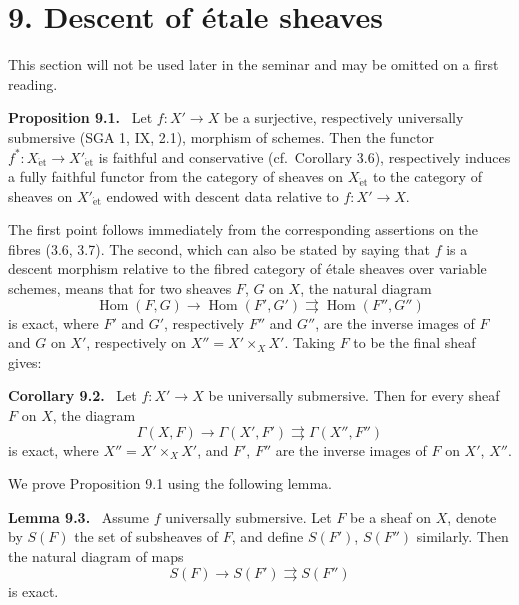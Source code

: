 \documentclass[11pt]{article}
\newcommand{\Hom}{\operatorname{Hom}}
\newcommand{\et}{\mathrm{\acute{e}t}}
\newcommand{\cf}{cf.\ }
\newcommand{\SGA}{SGA}
\newenvironment{statement}[1]{\par\medskip\noindent\textbf{#1.}\ }{\par\medskip}
\begin{document}
\section*{9. Descent of \'etale sheaves}

This section will not be used later in the seminar and may be omitted on a first reading.

\begin{statement}{Proposition 9.1}
Let \(f:X'\to X\) be a surjective, respectively universally submersive (\SGA{} 1, IX, 2.1), morphism of schemes. Then the functor \(f^*:X_{\et}\to X'_{\et}\) is faithful and conservative (\cf Corollary 3.6), respectively induces a fully faithful functor from the category of sheaves on \(X_{\et}\) to the category of sheaves on \(X'_{\et}\) endowed with descent data relative to \(f:X'\to X\).
\end{statement}

The first point follows immediately from the corresponding assertions on the fibres (3.6, 3.7). The second, which can also be stated by saying that \(f\) is a descent morphism relative to the fibred category of \'etale sheaves over variable schemes, means that for two sheaves \(F\), \(G\) on \(X\), the natural diagram
\[
\Hom(F,G)\longrightarrow\Hom(F',G')\rightrightarrows\Hom(F'',G'')
\tag{*}
\]
is exact, where \(F'\) and \(G'\), respectively \(F''\) and \(G''\), are the inverse images of \(F\) and \(G\) on \(X'\), respectively on \(X''=X'\times_XX'\). Taking \(F\) to be the final sheaf gives:

\begin{statement}{Corollary 9.2}
Let \(f:X'\to X\) be universally submersive. Then for every sheaf \(F\) on \(X\), the diagram
\[
\Gamma(X,F)\longrightarrow\Gamma(X',F')\rightrightarrows\Gamma(X'',F'')
\]
is exact, where \(X''=X'\times_XX'\), and \(F'\), \(F''\) are the inverse images of \(F\) on \(X'\), \(X''\).
\end{statement}

We prove Proposition 9.1 using the following lemma.

\begin{statement}{Lemma 9.3}
Assume \(f\) universally submersive. Let \(F\) be a sheaf on \(X\), denote by \(S(F)\) the set of subsheaves of \(F\), and define \(S(F')\), \(S(F'')\) similarly. Then the natural diagram of maps
\[
S(F)\longrightarrow S(F')\rightrightarrows S(F'')
\]
is exact.
\end{statement}
\end{document}
